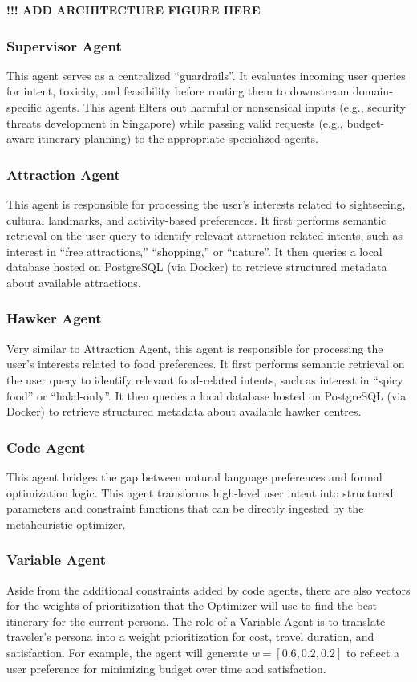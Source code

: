 \documentclass{ecai}
\begin{document}
\textbf{!!! ADD ARCHITECTURE FIGURE HERE}

\subsubsection{Supervisor Agent}
This agent serves as a centralized “guardrails”. It evaluates incoming user queries for intent, toxicity, and feasibility before routing them to downstream domain-specific agents. This agent filters out harmful or nonsensical inputs (e.g., security threats development in Singapore) while passing valid requests (e.g., budget-aware itinerary planning) to the appropriate specialized agents.

\subsubsection{Attraction Agent}
This agent is responsible for processing the user’s interests related to sightseeing, cultural landmarks, and activity-based preferences. It first performs semantic retrieval on the user query to identify relevant attraction-related intents, such as interest in “free attractions,” “shopping,” or “nature”. It then queries a local database hosted on PostgreSQL (via Docker) to retrieve structured metadata about available attractions.

\subsubsection{Hawker Agent}
Very similar to Attraction Agent, this agent is responsible for processing the user's interests related to food preferences. It first performs semantic retrieval on the user query to identify relevant food-related intents, such as interest in “spicy food” or “halal-only”. It then queries a local database hosted on PostgreSQL (via Docker) to retrieve structured metadata about available hawker centres.

\subsubsection{Code Agent}
This agent bridges the gap between natural language preferences and formal optimization logic. This agent transforms high-level user intent into structured parameters and constraint functions that can be directly ingested by the metaheuristic optimizer.

\subsubsection{Variable Agent}
Aside from the additional constraints added by code agents, there are also vectors for the weights of prioritization that the Optimizer will use to find the best itinerary for the current persona. The role of a Variable Agent is to translate traveler’s persona into a weight prioritization for cost, travel duration, and satisfaction. For example, the agent will generate $w=[0.6,0.2,0.2]$ to reflect a user preference for minimizing budget over time and satisfaction.
\end{document}
